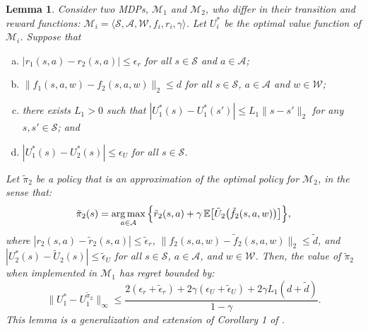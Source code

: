 \documentclass[11pt, notitlepage]{article}
\DeclareMathOperator*{\argmax}{arg\,max}
\newcommand{\E}{\mathbb{E}}
\newcommand{\1}{\mathbbm{1}}
\newtheorem{lemma}{Lemma}[section]
\begin{document}
\begin{lemma}
    \label{lemma:loss_bound}
    Consider two MDPs, $\mathcal M_1$ and $\mathcal M_2$, who differ in their transition and reward functions: $\mathcal M_i = \langle \mathcal{S}, \mathcal{A}, \mathcal{W}, f_i, r_i, \gamma \rangle$. Let $U_i^*$ be the optimal value function of $\mathcal M_i$. Suppose that
    \begin{enumerate}[(a)]
        \item $|r_1(s,a) - r_2(s,a)| \leq \epsilon_r$ for all $s\in\mathcal{S}$ and $a\in\mathcal{A}$;
        \item $\|f_1(s,a,w) - f_2(s,a,w)\|_2 \leq d$ for all $s \in \mathcal S$, $a \in \mathcal A$ and $w \in \mathcal W$;
        \item there exists $L_1 > 0$ such that $|U_1^*(s) - U_1^*(s')| \leq L_1 \|s-s'\|_2$ for any $s, s'\in\mathcal{S}$; and
        \item $|U_1^*(s)-U_2^*(s)|\leq \epsilon_U$ for all $s\in\mathcal S$.
    \end{enumerate}
    Let $\tilde{\pi}_2$ be a policy that is an approximation of the optimal policy for $\mathcal M_2$, in the sense that:
    \begin{equation}
    \label{eq.pi_2_greedy}
    \tilde{\pi}_2(s) = \argmax_{a \in \mathcal A} \, \Bigl\{ \tilde{r}_2(s, a) + \gamma \, \E \bigl [\tilde{U}_2\bigl(\tilde{f}_2(s,a,w)\bigr) \bigr] \Bigr\},
    \end{equation}
    where $|r_2(s,a) - \tilde{r}_2(s,a)| \leq \tilde{\epsilon}_r$, $\|f_2(s,a,w) - \tilde{f}_2(s,a,w)\|_2 \leq \tilde{d}$, and $|U_2^*(s)-\tilde{U}_2(s)|\leq \tilde{\epsilon}_U$ for all $s \in \mathcal S$, $a \in \mathcal A$, and $w \in \mathcal W$.
    Then, the value of $\tilde{\pi}_2$ when implemented in $\mathcal M_1$ has regret bounded by:
    \begin{equation*}
         \bigl \|U_1^* - U_1^{\tilde{\pi}_2}\bigr\|_\infty \leq \frac{2(\epsilon_r + \tilde{\epsilon}_r) + 2\gamma (\epsilon_U + \tilde{\epsilon}_U) + 2\gamma L_1 (d + \tilde{d})}{1-\gamma}.
    \end{equation*}
    This lemma is a generalization and extension of Corollary 1 of \cite{singh1994upper}.
\end{lemma}
\end{document}
